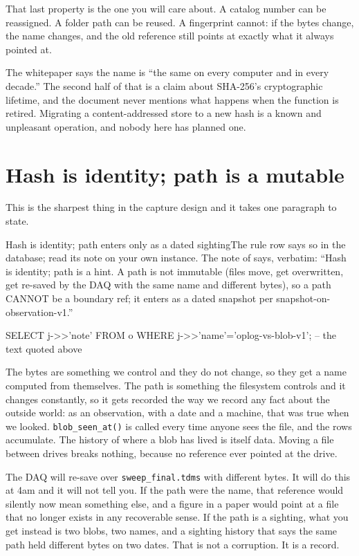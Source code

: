 That last property is the one you will care about. A catalog number can be reassigned. A folder path can be reused. A fingerprint cannot: if the bytes change, the name changes, and the old reference still points at exactly what it always pointed at.

The whitepaper says the name is ``the same on every computer and in every decade.'' The second half of that is a claim about SHA-256's cryptographic lifetime, and the document never mentions what happens when the function is retired. Migrating a content-addressed store to a new hash is a known and unpleasant operation, and nobody here has planned one.

\section{Hash is identity; path is a mutable}

This is the sharpest thing in the capture design and it takes one paragraph to state.

\begin{Correspondence}{Hash is identity; path enters only as a dated sighting}{The rule row says so in the database; read its note on your own instance.}
The note of  says, verbatim: ``Hash is identity; path is a hint. A path is not immutable (files move, get overwritten, get re-saved by the DAQ with the same name and different bytes), so a path CANNOT be a boundary ref; it enters as a dated snapshot per snapshot-on-observation-v1.''
\begin{Check}
SELECT j->>'note' FROM o WHERE j->>'name'='oplog-vs-blob-v1';  -- the text quoted above
\end{Check}
The bytes are something we control and they do not change, so they get a name computed from themselves. The path is something the filesystem controls and it changes constantly, so it gets recorded the way we record any fact about the outside world: as an observation, with a date and a machine, that was true when we looked. \texttt{blob\_seen\_at()} is called every time anyone sees the file, and the rows accumulate. The history of where a blob has lived is itself data. Moving a file between drives breaks nothing, because no reference ever pointed at the drive.
\end{Correspondence}

The DAQ will re-save over \texttt{sweep\_final.tdms} with different bytes. It will do this at 4am and it will not tell you. If the path were the name, that reference would silently now mean something else, and a figure in a paper would point at a file that no longer exists in any recoverable sense. If the path is a sighting, what you get instead is two blobs, two names, and a sighting history that says the same path held different bytes on two dates. That is not a corruption. It is a record.

